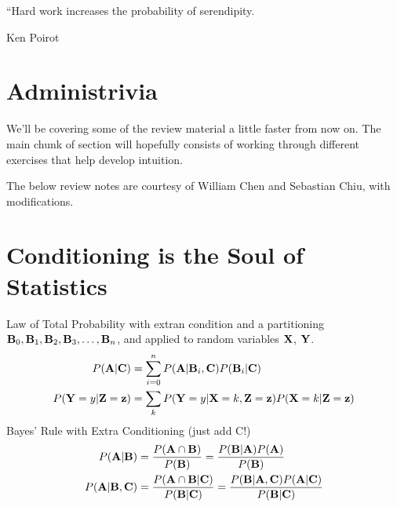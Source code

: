 \documentclass[11pt]{article}
\begin{document}

\setlength{\epigraphwidth}{.6\textwidth}
\epigraph{“Hard work increases the probability of serendipity.}{Ken Poirot}

\section*{Administrivia}
We'll be covering some of the review material a little faster from now on. The main chunk of section will hopefully consists of working through different exercises that help develop intuition.

The below review notes are courtesy of William Chen and Sebastian Chiu, with modifications.
\section*{Conditioning is the Soul of Statistics}

Law of Total Probability with extran condition and a partitioning ${\bf B}_0, {\bf B}_1, {\bf B}_2, {\bf B}_3, \dots, {\bf B}_n$, and applied to random variables ${\bf X}$, ${\bf Y}$.
\begin{align*}
P({\bf A} | {\bf C}) &= \sum_{i=0}^n P({\bf A} | {\bf B}_i, {\bf C})P({\bf B}_i| {\bf C}) \\
P({\bf Y}=y | {\bf Z = z}) &= \sum_{k}P({\bf Y}=y|{\bf X}=k,  {\bf Z = z})P({\bf X}=k |  {\bf Z = z})
   \end{align*}
Bayes' Rule with Extra Conditioning (just add C!)
\begin{align*}
   P({\bf A}|{\bf B}) &= \frac{P({\bf A} \cap {\bf B})}{P({\bf B})} = \frac{P({\bf B}|{\bf A})P({\bf A})}{P({\bf B})} \\
   P({\bf A}|{\bf B}, {\bf C}) &= \frac{P({\bf A} \cap {\bf B} | {\bf C})}{P({\bf B} | {\bf C})} = \frac{P({\bf B}|{\bf A}, {\bf C})P({\bf A} | {\bf C})}{P({\bf B} | {\bf C})}
\end{align*}
\end{document}
